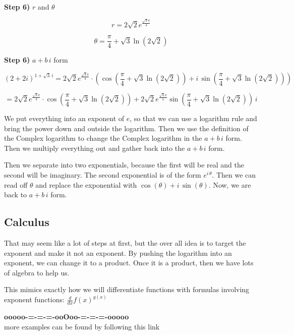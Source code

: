 \documentclass{ximera}
\begin{document}
\begin{procedure}
\textbf{\textcolor{blue!75!black}{Step 6)}}  $r$ and $\theta$ 



\[ r =  2\sqrt{2}  e^{\frac{\sqrt{3}\pi}{4}} \]

\[ \theta =  \frac{\pi}{4} + \sqrt{3} \ln(2\sqrt{2}) \]


\textbf{\textcolor{blue!75!black}{Step 6)}}  $a + b \, i$ form


\[
 (2+2i)^{1+\sqrt{3} \, i}   = 2\sqrt{2}  e^{\frac{\sqrt{3}\pi}{4}} \cdot \left( \cos\left( \frac{\pi}{4} + \sqrt{3} \ln(2\sqrt{2}) \right) + i \, \sin\left( \frac{\pi}{4} + \sqrt{3} \ln(2\sqrt{2}) \right) \right)
\]




\[
   = 2\sqrt{2}  e^{\frac{\sqrt{3}\pi}{4}} \cdot  \cos\left( \frac{\pi}{4} + \sqrt{3} \ln(2\sqrt{2}) \right) + 2\sqrt{2}  e^{\frac{\sqrt{3}\pi}{4}} \sin\left( \frac{\pi}{4} + \sqrt{3} \ln(2\sqrt{2}) \right) \, i
\]

\end{procedure}



We put everything into an exponent of $e$, so that we can use a logarithm rule and bring the power down and outside the logarithm.  Then we use the definition of the Complex logarithm to change the Complex logarithm in the $a + b \, i$ form. Then we multiply everything out and gather back into the $a + b \, i$ form. 

Then we separate into two exponentials, because the first will be real and the second will be imaginary. The second exponential is of the form $e^{i \, \theta}$.  Then we can read off $\theta$ and replace the exponential with $\cos(\theta) + i \, \sin(\theta)$.  Now, we are back to $a + b \, i$ form.




\subsection*{Calculus}

That may seem like a lot of steps at first, but the over all idea is to target the exponent and make it not an exponent. By pushing the logarithm into an exponent, we can change it to a product.  Once it is a product, then we have lots of algebra to help us.

This mimics exactly how we will differentiate functions with formulas involving exponent functions:  $\frac{d}{dx} f(x)^{g(x)}$






















\begin{center}
\textbf{\textcolor{green!50!black}{ooooo-=-=-=-ooOoo-=-=-=-ooooo}} \\

more examples can be found by following this link\\ 

\end{center}
\end{document}
